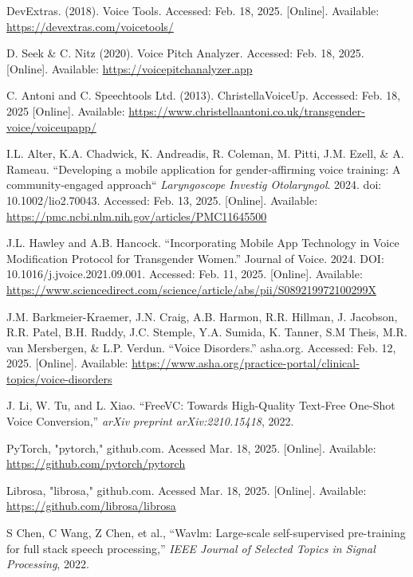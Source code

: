 \documentclass{article}
\begin{document}
%
\begin{thebibliography}{citations}
DevExtras. (2018). Voice Tools. Accessed: Feb. 18, 2025. [Online]. Available: \url{https://devextras.com/voicetools/}

D. Seek \& C. Nitz (2020). Voice Pitch Analyzer. Accessed: Feb. 18, 2025. [Online]. Available: \url{https://voicepitchanalyzer.app}

C. Antoni and C. Speechtools Ltd. (2013). ChristellaVoiceUp. Accessed: Feb. 18, 2025 [Online]. Available: \url{https://www.christellaantoni.co.uk/transgender-voice/voiceupapp/}

I.L. Alter, K.A. Chadwick, K. Andreadis, R. Coleman, M. Pitti, J.M. Ezell, & A. Rameau. “Developing a mobile application for gender‐affirming voice training: A community‐engaged approach“ \textit{Laryngoscope Investig Otolaryngol}. 2024. doi: 10.1002/lio2.70043. Accessed: Feb. 13, 2025. [Online]. Available: \url{https://pmc.ncbi.nlm.nih.gov/articles/PMC11645500}

J.L. Hawley and A.B. Hancock. “Incorporating Mobile App Technology in Voice Modification Protocol for Transgender Women.” Journal of Voice. 2024. DOI: 10.1016/j.jvoice.2021.09.001. Accessed: Feb. 11, 2025. [Online]. Available:
\url{https://www.sciencedirect.com/science/article/abs/pii/S089219972100299X}

J.M. Barkmeier-Kraemer, J.N. Craig, A.B. Harmon, R.R. Hillman, J. Jacobson, R.R. Patel, B.H. Ruddy, J.C. Stemple, Y.A. Sumida, K. Tanner, S.M Theis, M.R. van Mersbergen, \& L.P. Verdun. “Voice Disorders.” asha.org. Accessed: Feb. 12, 2025. [Online]. Available: \url{https://www.asha.org/practice-portal/clinical-topics/voice-disorders}

J. Li, W. Tu, and L. Xiao. “FreeVC: Towards High-Quality Text-Free One-Shot Voice Conversion,” \textit{arXiv preprint arXiv:2210.15418}, 2022.

PyTorch, "pytorch," github.com. Acessed Mar. 18, 2025. [Online]. Available: \url{https://github.com/pytorch/pytorch}

Librosa, "librosa," github.com. Acessed Mar. 18, 2025. [Online]. Available: \url{https://github.com/librosa/librosa}

S Chen, C Wang, Z Chen, et al., “Wavlm: Large-scale self-supervised pre-training for full stack speech processing,” \textit{IEEE Journal of Selected Topics in Signal Processing}, 2022.


\end{thebibliography}
\end{document}

